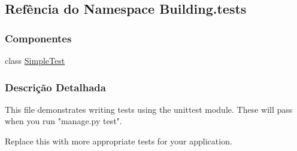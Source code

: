 \hypertarget{namespaceBuilding_1_1tests}{}\subsection{Refência do Namespace Building.\+tests}
\label{namespaceBuilding_1_1tests}
\subsubsection*{Componentes}
\begin{DoxyCompactItemize}
\item 
class \hyperlink{classBuilding_1_1tests_1_1SimpleTest}{Simple\+Test}
\end{DoxyCompactItemize}


\subsubsection{Descrição Detalhada}
\begin{DoxyVerb}This file demonstrates writing tests using the unittest module. These will pass
when you run "manage.py test".

Replace this with more appropriate tests for your application.
\end{DoxyVerb}
 